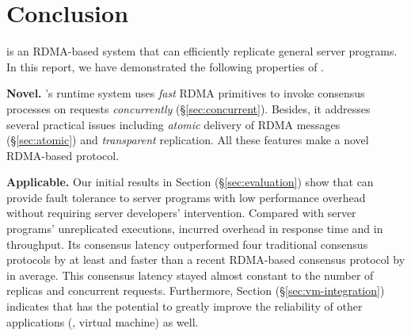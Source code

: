 \section{Conclusion} \label{sec:conclusion}

\xxx is an RDMA-based \paxos system that can efficiently replicate general 
server programs. In this report, we have demonstrated the following properties 
of \xxx.

\textbf{Novel.} \xxx's runtime system uses \emph{fast} RDMA primitives to 
invoke consensus processes on requests \emph{concurrently} 
(\S\ref{sec:concurrent}). Besides, it addresses several practical issues 
including \emph{atomic} delivery of RDMA messages (\S\ref{sec:atomic}) and  
\emph{transparent} replication. All these features make \xxx a novel RDMA-based 
\paxos protocol.

\textbf{Applicable.} Our initial results in Section 
(\S\ref{sec:evaluation}) show that \xxx can provide fault tolerance to server 
programs with low performance overhead without requiring server developers' 
intervention. Compared with \nprog server programs' unreplicated executions, 
\xxx incurred \latencyoverhead overhead in response time and \tputoverhead in 
throughput. Its consensus latency outperformed four traditional consensus 
protocols by at least \comptradlow and faster than a recent RDMA-based consensus 
protocol \dare by \fasterDARE in average. This consensus latency stayed almost 
constant  to the number of replicas and concurrent requests. Furthermore, 
Section (\S\ref{sec:vm-integration}) indicates that \xxx has the potential to 
greatly improve the reliability of other applications (\eg, virtual machine) as 
well.
